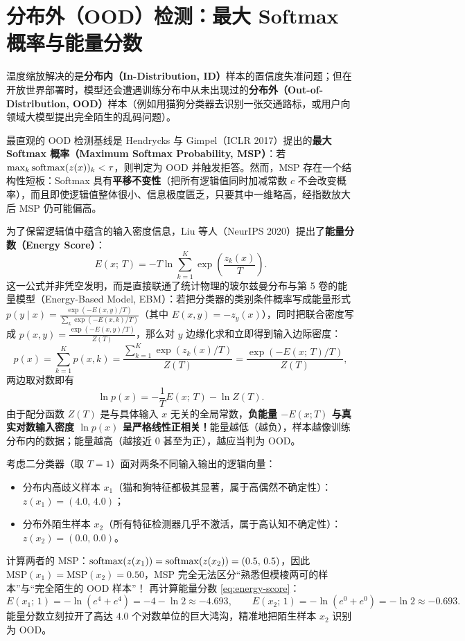 \section{分布外（OOD）检测：最大 Softmax 概率与能量分数}

温度缩放解决的是\textbf{分布内（In-Distribution, ID）}样本的置信度失准问题；但在开放世界部署时，模型还会遭遇训练分布中从未出现过的\textbf{分布外（Out-of-Distribution, OOD）}样本（例如用猫狗分类器去识别一张交通路标，或用户向领域大模型提出完全陌生的乱码问题）。

最直观的 OOD 检测基线是 Hendrycks 与 Gimpel（ICLR 2017）提出的\textbf{最大 Softmax 概率（Maximum Softmax Probability, MSP）}：若 $\max_k \operatorname{softmax}(z(x))_k < \tau$，则判定为 OOD 并触发拒答。然而，MSP 存在一个结构性短板：Softmax 具有\textbf{平移不变性}（把所有逻辑值同时加减常数 $c$ 不会改变概率），而且即使逻辑值整体很小、信息极度匮乏，只要其中一维略高，经指数放大后 MSP 仍可能偏高。

为了保留逻辑值中蕴含的输入密度信息，Liu 等人（NeurIPS 2020）提出了\textbf{能量分数（Energy Score）}：
\begin{equation}\label{eq:energy-score}
  E(x;\, T) = -T \ln \sum_{k=1}^K \exp\!\left(\frac{z_k(x)}{T}\right).
\end{equation}
这一公式并非凭空发明，而是直接联通了统计物理的玻尔兹曼分布与第 5 卷的能量模型（Energy-Based Model, EBM）：若把分类器的类别条件概率写成能量形式 $p(y \mid x) = \frac{\exp(-E(x,y)/T)}{\sum_k \exp(-E(x,k)/T)}$（其中 $E(x,y) = -z_y(x)$），同时把联合密度写成 $p(x,y) = \frac{\exp(-E(x,y)/T)}{Z(T)}$，那么对 $y$ 边缘化求和立即得到输入边际密度：
\[
  p(x) = \sum_{k=1}^K p(x, k) = \frac{\sum_{k=1}^K \exp(z_k(x)/T)}{Z(T)} = \frac{\exp(-E(x;\,T)/T)}{Z(T)},
\]
两边取对数即有
\begin{equation}\label{eq:energy-density}
  \ln p(x) = -\frac{1}{T} E(x;\, T) - \ln Z(T).
\end{equation}
由于配分函数 $Z(T)$ 是与具体输入 $x$ 无关的全局常数，\textbf{负能量 $-E(x;T)$ 与真实对数输入密度 $\ln p(x)$ 呈严格线性正相关！}能量越低（越负），样本越像训练分布内的数据；能量越高（越接近 $0$ 甚至为正），越应当判为 OOD。

\begin{example}\label{ex:energy-vs-msp}
考虑二分类器（取 $T=1$）面对两条不同输入输出的逻辑向量：
\begin{itemize}
  \item 分布内高歧义样本 $x_1$（猫和狗特征都极其显著，属于高偶然不确定性）：$z(x_1) = (4.0,\, 4.0)$；
  \item 分布外陌生样本 $x_2$（所有特征检测器几乎不激活，属于高认知不确定性）：$z(x_2) = (0.0,\, 0.0)$。
\end{itemize}
计算两者的 MSP：$\operatorname{softmax}(z(x_1)) = \operatorname{softmax}(z(x_2)) = (0.5,\, 0.5)$，因此 $\mathrm{MSP}(x_1) = \mathrm{MSP}(x_2) = 0.50$，MSP 完全无法区分“熟悉但模棱两可的样本”与“完全陌生的 OOD 样本”！
再计算能量分数 \eqref{eq:energy-score}：
\[
  E(x_1;\,1) = -\ln(e^4 + e^4) = -4 - \ln 2 \approx -4.693,
  \qquad
  E(x_2;\,1) = -\ln(e^0 + e^0) = -\ln 2 \approx -0.693.
\]
能量分数立刻拉开了高达 $4.0$ 个对数单位的巨大鸿沟，精准地把陌生样本 $x_2$ 识别为 OOD。
\end{example}


